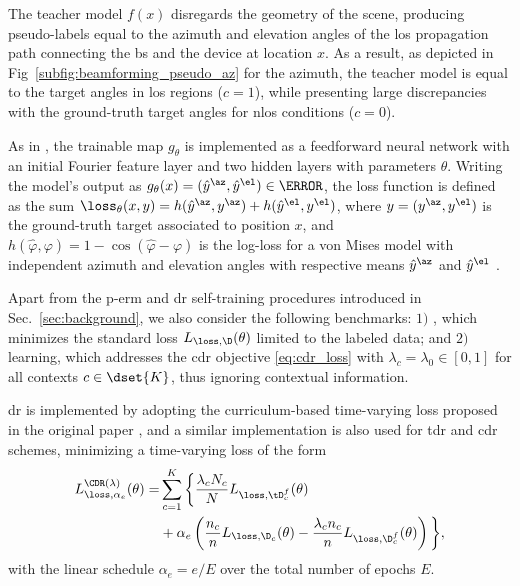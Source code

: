 \documentclass[journal]{IEEEtran}
\begin{document}
The teacher model $f(x)$ disregards the geometry of the scene, producing pseudo-labels equal to the azimuth and elevation angles of the \gls{los} propagation path connecting the \gls{bs} and the device at location $x$.
As a result, as depicted in Fig~\ref{subfig:beamforming_pseudo_az} for the azimuth, the teacher model is equal to the target angles in \gls{los} regions ($c = 1$), while presenting large discrepancies with the ground-truth target angles for \gls{nlos} conditions ($c = 0$).

As in \cite{tancik2020fourier}, the trainable map $g_\theta$ is implemented as a feedforward neural network with an initial Fourier feature layer and two hidden layers with parameters $\theta$.
Writing the model's output as $g_\theta(x) = (\hat{y}^\az, \hat{y}^\el) \in \A$, the loss function is defined as the sum $\loss_\theta(x, y) = h(\hat{y}^\az, y^\az) + h(\hat{y}^\el, y^\el)$, where $y = (y^\az, y^\el)$ is the ground-truth target associated to position $x$, and $h(\hat{\varphi}, \varphi) = 1 - \cos(\hat{\varphi} - \varphi)$ is the log-loss for a von Mises model with independent azimuth and elevation angles with respective means $\hat{y}^\az$ and $\hat{y}^\el$ \cite{mardia2000directional}.

Apart from the \gls{p-erm} and \gls{dr} self-training procedures introduced in Sec.~\ref{sec:background}, we also consider the following benchmarks:
$1)$ , which minimizes the standard loss $L_{\loss, \D}(\theta)$ limited to the labeled data; and $2)$  learning, which addresses the \gls{cdr} objective \eqref{eq:cdr_loss} with $\lambda_c = \lambda_0 \in [0, 1]$ for all contexts $c \in \dset{K}$, thus ignoring contextual information.

\gls{dr} is implemented by adopting the curriculum-based time-varying loss proposed in the original paper \cite{zhu2024doubly}, and a similar implementation is also used for \gls{tdr} and \gls{cdr} schemes, minimizing a time-varying loss of the form
\begin{equation}
\label{eq:cdr_loss_curriculum}
\begin{split}
L^{\CDR(\lambda)}_{\loss, \alpha_e}(\theta) = 
    &\sum_{c=1}^{K} \bigg\{
        \frac{\lambda_c N_c}{N} L_{\loss, \tD^f_c}(\theta) \\
        & + \alpha_e \left(
            \frac{n_c}{n} L_{\loss, \D_c}(\theta) -
            \frac{\lambda_c n_c}{n} L_{\loss, \D^f_c}(\theta)
        \right)
    \bigg\},
\end{split}
\end{equation}
with the linear schedule $\alpha_e = e/E$ over the total number of epochs $E$.
\end{document}
